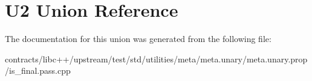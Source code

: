 \hypertarget{union_u2}{}\section{U2 Union Reference}
\label{union_u2}


The documentation for this union was generated from the following file\+:\begin{DoxyCompactItemize}
\item 
contracts/libc++/upstream/test/std/utilities/meta/meta.\+unary/meta.\+unary.\+prop/is\+\_\+final.\+pass.\+cpp\end{DoxyCompactItemize}
